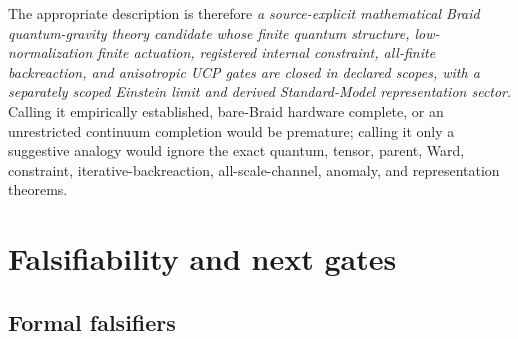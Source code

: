 \documentclass[11pt]{article}
\theoremstyle{definition}
\theoremstyle{remark}
\begin{document}
The appropriate description is therefore \emph{a source-explicit mathematical Braid quantum-gravity theory candidate whose finite quantum structure, low-normalization finite actuation, registered internal constraint, all-finite backreaction, and anisotropic UCP gates are closed in declared scopes, with a separately scoped Einstein limit and derived Standard-Model representation sector}. Calling it empirically established, bare-Braid hardware complete, or an unrestricted continuum completion would be premature; calling it only a suggestive analogy would ignore the exact quantum, tensor, parent, Ward, constraint, iterative-backreaction, all-scale-channel, anomaly, and representation theorems.

\section{Falsifiability and next gates}

\subsection{Formal falsifiers}
\end{document}
